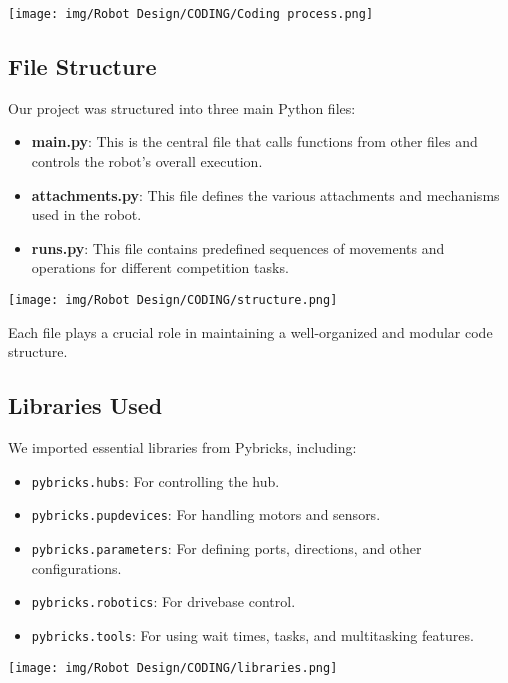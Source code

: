 \begin{center}
  \texttt{[image: img/Robot Design/CODING/Coding process.png]}
\end{center}
\subsection{File Structure}
Our project was structured into three main Python files:
\begin{itemize}
    \item \textbf{main.py}: This is the central file that calls functions from other files and controls the robot's overall execution.
    \item \textbf{attachments.py}: This file defines the various attachments and mechanisms used in the robot.
    \item \textbf{runs.py}: This file contains predefined sequences of movements and operations for different competition tasks.
\end{itemize} 
\begin{center}
  \texttt{[image: img/Robot Design/CODING/structure.png]}
\end{center}
Each file plays a crucial role in maintaining a well-organized and modular code structure.

\subsection{Libraries Used}

We imported essential libraries from Pybricks, including:
\begin{itemize}
    \item \texttt{pybricks.hubs}: For controlling the hub.
    \item \texttt{pybricks.pupdevices}: For handling motors and sensors.
    \item \texttt{pybricks.parameters}: For defining ports, directions, and other configurations.
    \item \texttt{pybricks.robotics}: For drivebase control.
    \item \texttt{pybricks.tools}: For using wait times, tasks, and multitasking features.
\end{itemize}
\begin{center}
  \texttt{[image: img/Robot Design/CODING/libraries.png]}
\end{center}


